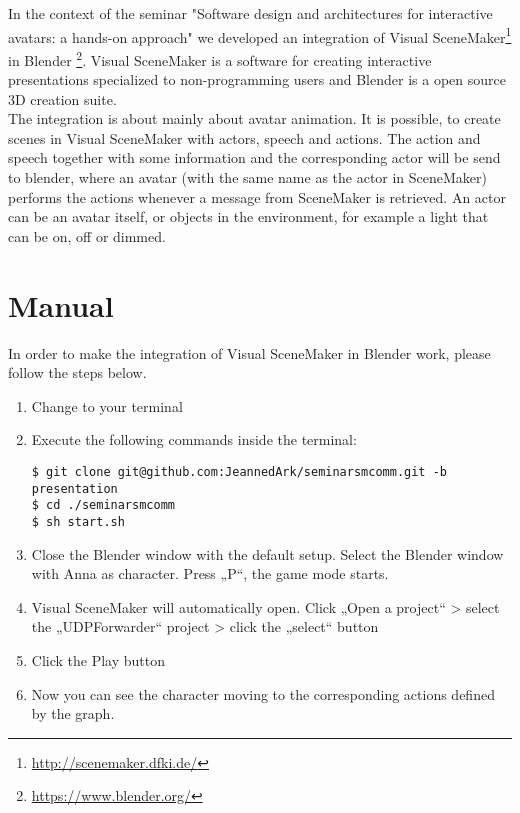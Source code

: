 \documentclass[
10pt, %
a4paper, %
oneside,
headinclude,footinclude, %
BCOR5mm, %
]{scrartcl}
\begin{document}
In the context of the seminar "Software design and architectures for interactive avatars: a hands-on approach" we developed an integration of Visual SceneMaker\footnote{\url{http://scenemaker.dfki.de/}} in Blender \footnote{\url{https://www.blender.org/}}.
Visual SceneMaker is a software for creating interactive presentations specialized to non-programming users and Blender is a open source 3D creation suite.\\
The integration is about mainly about avatar animation. It is possible, to create scenes in Visual SceneMaker with actors, speech and actions. The action and speech together with some information and the corresponding actor will be send to blender, where an avatar (with the same name as the actor in SceneMaker) performs the actions whenever a message from SceneMaker is retrieved. An actor can be an avatar itself, or objects in the environment, for example a light that can be on, off or dimmed.

\section{Manual}
In order to make the integration of Visual SceneMaker in Blender work, please follow the steps below.
\begin{enumerate}[noitemsep] %
\item Change to your terminal
\item Execute the following commands inside the terminal:
\begin{lstlisting}
$ git clone git@github.com:JeannedArk/seminarsmcomm.git -b presentation
$ cd ./seminarsmcomm
$ sh start.sh
\end{lstlisting}
\item Close the Blender window with the default setup. Select the Blender window with Anna as character. Press „P“, the game mode starts.
\item Visual SceneMaker will automatically open. Click „Open a project“ > select the „UDPForwarder“ project > click the „select“ button
\item Click the Play button
\item Now you can see the character moving to the corresponding actions defined by the graph.
\end{enumerate}
\end{document}
